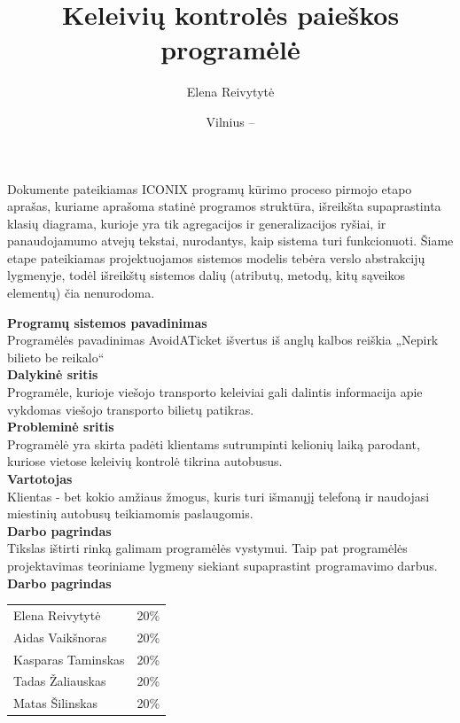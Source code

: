 \documentclass{VUMIFPSkursinis}
\title{Keleivių kontrolės paieškos programėlė}
\author{Elena Reivytytė}
\date{Vilnius – \the\year}
\begin{document}
\maketitle

Dokumente pateikiamas ICONIX programų kūrimo proceso pirmojo etapo aprašas, kuriame aprašoma statinė programos struktūra, išreikšta supaprastinta klasių diagrama, kurioje yra tik agregacijos ir generalizacijos ryšiai, ir panaudojamumo atvejų tekstai, nurodantys, kaip sistema turi funkcionuoti. Šiame etape pateikiamas projektuojamos sistemos modelis tebėra verslo abstrakcijų lygmenyje, todėl išreikštų sistemos dalių (atributų, metodų, kitų sąveikos elementų) čia nenurodoma.

\tableofcontents

\noindent
\textbf{Programų sistemos pavadinimas}\\
Programėlės pavadinimas AvoidATicket išvertus iš anglų kalbos reiškia „Nepirk bilieto be reikalo“\\
\textbf{Dalykinė sritis}\\
Programėle, kurioje viešojo transporto keleiviai gali dalintis informacija apie vykdomas viešojo transporto bilietų patikras.\\
\textbf{Probleminė sritis}\\
Programėlė yra skirta padėti klientams sutrumpinti kelionių laiką parodant, kuriose vietose keleivių kontrolė tikrina autobusus.\\
\textbf{Vartotojas}\\
Klientas - bet kokio amžiaus žmogus, kuris turi išmanųjį telefoną ir naudojasi miestinių autobusų teikiamomis paslaugomis.\\
\textbf{Darbo pagrindas}\\
Tikslas ištirti rinką galimam programėlės vystymui. Taip pat programėlės projektavimas teoriniame lygmeny siekiant supaprastint programavimo darbus.\\
\textbf{Darbo pagrindas}\\
\begin{tabular}{lr}
   Elena Reivytytė & 20\% \\
   Aidas Vaikšnoras & 20\% \\
   Kasparas Taminskas & 20\% \\
   Tadas Žaliauskas & 20\% \\
   Matas Šilinskas & 20\% \\
\end{tabular}
\end{document}
